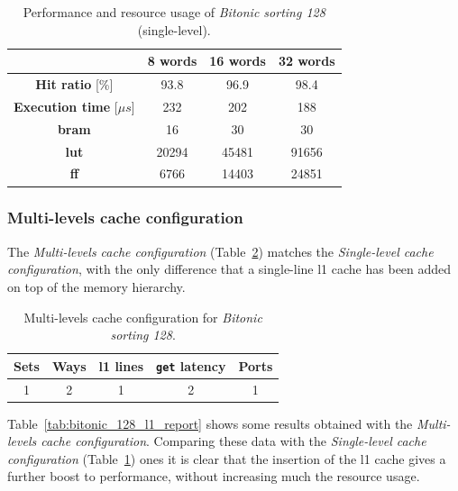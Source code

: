 \documentclass[11pt,a4paper,oneside]{memoir}
\begin{document}
\begin{table}[H]
	\begin{center}
		\begin{tabular}{cccc}
			\hline
			\rowcolor{gray!50}
			& \textbf{8 words} & \textbf{16 words} & \textbf{32 words} \\
			\hline
			\textbf{Hit ratio} [\%] & 93.8 & 96.9 & 98.4 \\
			\rowcolor{gray!25}
			\textbf{Execution time} [$\mu s$] & 232 & 202 & 188 \\
			\textbf{\ac{bram}} & 16 & 30 & 30 \\
			\rowcolor{gray!25}
			\textbf{\acs{lut}} & 20294 & 45481 & 91656 \\
			\textbf{\acs{ff}} & 6766 & 14403 & 24851 \\
			\hline
		\end{tabular}
	\end{center}
	\caption{Performance and resource usage of \emph{Bitonic sorting 128} (single-level).}
	\label{tab:bitonic_128_no_l1_report}
\end{table}

\subsubsection{Multi-levels cache configuration}
The \emph{Multi-levels cache configuration}
(Table~\ref{tab:bitonic_128_l1_config}) matches the \emph{Single-level cache
configuration}, with the only difference that a single-line \ac{l1} cache has
been added on top of the memory hierarchy.

\begin{table}[H]
	\begin{center}
		\begin{tabular}{ccccc}
			\hline
			\rowcolor{gray!50}
			\textbf{Sets} & \textbf{Ways} & \textbf{\ac{l1} lines} &
			\textbf{\texttt{get} latency} & \textbf{Ports} \\
			\hline
			1 & 2 & 1 & 2 & 1 \\
			\hline
		\end{tabular}
	\end{center}
	\caption{Multi-levels cache configuration for \emph{Bitonic sorting 128}.}
	\label{tab:bitonic_128_l1_config}
\end{table}

Table~\ref{tab:bitonic_128_l1_report} shows some results obtained with the
\emph{Multi-levels cache configuration}. Comparing these data with the
\emph{Single-level cache configuration}
(Table~\ref{tab:bitonic_128_no_l1_report}) ones it is clear that the insertion
of the \ac{l1} cache gives a further boost to performance, without increasing
much the resource usage.
\end{document}
